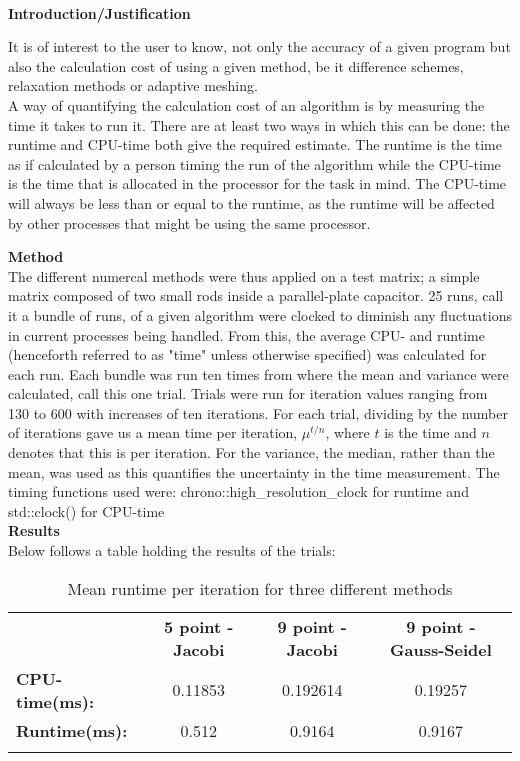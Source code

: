 \documentclass[a4paper]{jpconf}
\begin{document}
 \\

\textbf{Introduction/Justification}

It is of interest to the user to know, not only the accuracy of a given program but also the calculation cost of using a given method, be it difference schemes, relaxation methods or adaptive meshing. \\
A way of quantifying the calculation cost of an algorithm is by measuring the time it takes to run it. There are at least two ways in which this can be done: the runtime and CPU-time both give the required estimate. The runtime is the time as if calculated by a person timing the run of the algorithm while the CPU-time is the time that is allocated in the processor for the task in mind. The CPU-time will always be less than or equal to the runtime, as the runtime will be affected by other processes that might be using the same processor.\cite{cpu_time}

\textbf{Method} \\
The different numercal methods were thus applied on a test matrix; a simple matrix composed of two small rods inside a parallel-plate capacitor. 25 runs, call it a bundle of runs, of a given algorithm were clocked to diminish any fluctuations in current processes being handled. From this, the average CPU- and runtime (henceforth referred to as "time" unless otherwise specified) was calculated for each run. Each bundle was run ten times from where the mean and variance were calculated, call this one trial. Trials were run for iteration values ranging from 130 to 600 with increases of ten iterations. For each trial, dividing by the number of iterations gave us a mean time per iteration, $\mu^{t/n}$, where $t$ is the time and $n$ denotes that this is per iteration. For the variance, the median, rather than the mean, was used as this quantifies the uncertainty in the time measurement. The timing functions used were: chrono::high_resolution_clock for runtime and std::clock() for CPU-time \\

\textbf{Results} \\
Below follows a table holding the results of the trials:

\begin{table}[h!]
	\caption{Mean runtime per iteration for three different methods}
	\begin{center}
		\begin{tabular}{l c c c }
			\br 
			& \textbf{5 point - Jacobi} & \textbf{9 point - Jacobi} & \textbf{9 point -  Gauss-Seidel} \\ 
			\mr
			\textbf{CPU-time(ms):} 	& 0.11853 	& 0.192614 & 0.19257 \\
			\textbf{Runtime(ms):} 	& 0.512 		& 0.9164 & 0.9167 \\
			\br
		\end{tabular}
	\end{center}
	\label{table:cpu}
\end{table}
\end{document}
